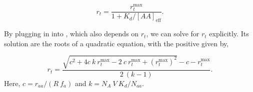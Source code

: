 \begin{equation}
r_t = \frac{r_{t}^{\text{max}}}{1 + K_d/[AA]_{\text{eff}}}.
\label{eq:rt_kd_simple}
\end{equation}

By plugging in  into , which also depends on $r_t$, we
can solve for $r_t$ explicitly. Its solution are the roots of a quadratic equation,
with the positive given by,

\begin{equation}
r_t = \frac{\sqrt{c^2 + 4 c \ k \ r_{t}^{\text{max}} - 2 \ c \ r_{t}^{\text{max}} + (r_{t}^{\text{max}})^2} - c - r_{t}^{\text{max}}}{2 \ (k-1)}.
\label{eq:rt_final}
\end{equation}
Here, $c = r_{aa}/(R \ f_a)$ and $k = N_A \ V \ K_d / N_{aa}$.


%
%
%
%
%
%
%
%
%
%
%
%
%
%
%
%
%

